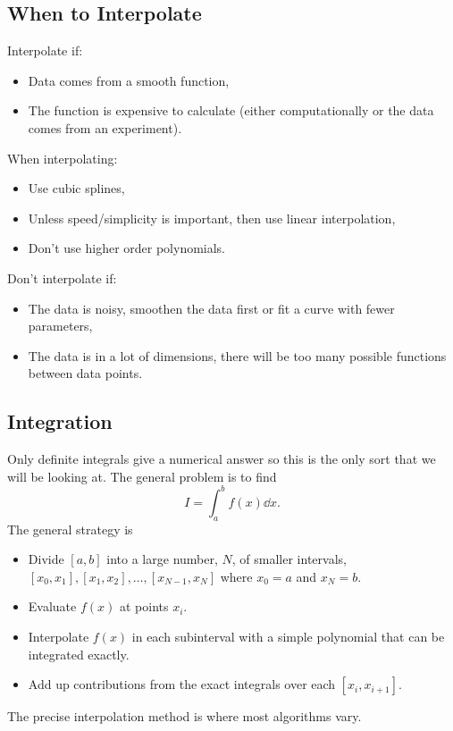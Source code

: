 \documentclass[a4paper]{article}
\begin{document}
    \subsection{When to Interpolate}
    Interpolate if:
    \begin{itemize}
        \item Data comes from a smooth function,
        \item The function is expensive to calculate (either computationally or the data comes from an experiment).
    \end{itemize}
    When interpolating:
    \begin{itemize}
        \item Use cubic splines,
        \item Unless speed/simplicity is important, then use linear interpolation,
        \item Don't use higher order polynomials.
    \end{itemize}
    Don't interpolate if:
    \begin{itemize}
        \item The data is noisy, smoothen the data first or fit a curve with fewer parameters,
        \item The data is in a lot of dimensions, there will be too many possible functions between data points.
    \end{itemize}
    
    \subsection{Integration}
    Only definite integrals give a numerical answer so this is the only sort that we will be looking at.
    The general problem is to find
    \[I = \int_a^b f(x)\dd{x}.\]
    The general strategy is
    \begin{itemize}
        \item Divide \([a, b]\) into a large number, \(N\), of smaller intervals, \([x_0, x_1], [x_1, x_2], \dotsc, [x_{N-1}, x_N]\) where \(x_0 = a\) and \(x_N = b\).
        \item Evaluate \(f(x)\) at points \(x_i\).
        \item Interpolate \(f(x)\) in each subinterval with a simple polynomial that can be integrated exactly.
        \item Add up contributions from the exact integrals over each \([x_i, x_{i+1}]\).
    \end{itemize}
    The precise interpolation method is where most algorithms vary.
    
\end{document}
